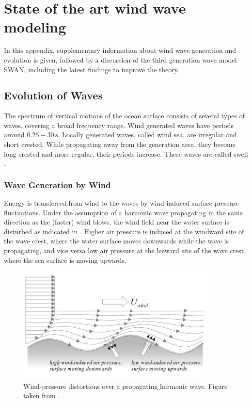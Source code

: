 \chapter{State of the art wind wave modeling}

In this appendix, supplementary information about wind wave generation and 
evolution is given, followed by a discussion of the third generation wave model 
SWAN, including the latest findings to improve the theory.

\section{Evolution of Waves}

The spectrum of vertical motions of the ocean surface consists of several types 
of waves, covering a broad frequency range.  Wind generated 
waves have periods around $0.25 - 30\,\text{s}$. Locally generated waves, 
called 
wind sea, are irregular and short crested. While propagating away from the 
generation area, they become long crested and more regular, their periods 
increase. These waves are called swell \citep[][]{holthuijsen2007}. 

\subsection{Wave Generation by Wind}
Energy is transferred from wind to the waves by wind-induced surface pressure 
fluctuations. 
Under the assumption of a harmonic wave propagating in the same direction as 
the (faster) wind 
blows, the wind field near the water surface is disturbed as indicated in 
. Higher air pressure is induced at the windward site of the wave 
crest, where the water surface moves downwards while the wave is propagating, 
and vice versa low air pressure at the leeward site of the wave crest, where 
the sea surface is moving upwards.
\begin{figure}[ht]

 \includegraphics[width=10cm]{bilder/windpressure_sw.png}
 \caption{Wind-pressure distortions over a propagating harmonic wave. Figure 
taken from \cite{holthuijsen2007}. \label{windgen}}
\end{figure}


